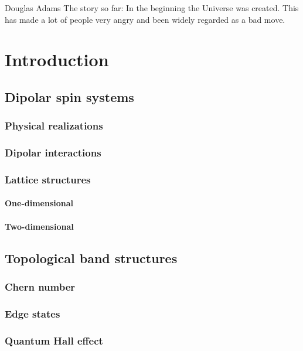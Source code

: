 \begin{tquote}{Douglas Adams}
    The story so far: In the beginning the Universe was created.
    This has made a lot of people very angry and been widely regarded as a bad move.
\end{tquote}

\chapter{Introduction}

\section{Dipolar spin systems}
\subsection{Physical realizations}
\subsection{Dipolar interactions}
\subsection{Lattice structures}
\subsubsection{One-dimensional}
\subsubsection{Two-dimensional}

\section{Topological band structures}
\subsection{Chern number}
\subsection{Edge states}
\subsection{Quantum Hall effect}
